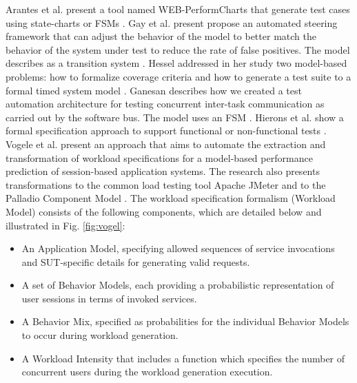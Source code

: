 \documentclass[espaco=umemeio,chapter=TITLE,twoside,openright]{abnt}
\begin{document}
Arantes et al. present a tool named WEB-PerformCharts that generate test cases using state-charts or FSMs \cite{Arantes2014}. Gay et al. present propose an automated steering framework that can adjust the behavior of the model to better match the behavior of the system under test to reduce the rate of false positives.  The model describes as a transition system \cite{Gay2016}. Hessel addressed in her study two model-based problems: how to formalize coverage criteria and how to generate a test suite to a formal timed system model \cite{Hessel2007}. Ganesan describes how we created a test automation architecture for testing concurrent inter-task communication as carried out by the software bus. The model uses an FSM \cite{Ganesan2016}. Hierons et al. show a formal specification approach to support functional or non-functional tests \cite{Hierons2009}. Vogele et al. present an approach that aims to automate the extraction and transformation of workload specifications for a model-based performance prediction of session-based application systems.  The research also presents transformations to the common load testing tool Apache JMeter and to the Palladio Component Model \cite{Vogele2016} \cite{utting2010practical}. The workload specification formalism (Workload Model) consists of the following components, which are detailed below and illustrated in Fig. \ref{fig:vogel}:
\begin{itemize}
\item An Application Model, specifying allowed sequences of service invocations and SUT-specific details for generating valid requests.
\item A set of Behavior Models, each providing a probabilistic representation of user sessions in terms of invoked services.
\item A Behavior Mix, specified as probabilities for the individual Behavior Models to occur during workload generation.
\item A Workload Intensity that includes a function which specifies the number of concurrent users during the workload generation execution.
\end{itemize}
\end{document}

